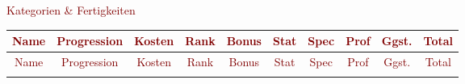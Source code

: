 \begin{center}
\textcolor{Maroon}{\Large Kategorien \& Fertigkeiten}


\begin{longtable}{llrrrrrrrr}

\multicolumn{1}{c}{\textcolor{Maroon}{Name}} & \multicolumn{1}{c}{\textcolor{Maroon}{Progression}} & \multicolumn{1}{c}{\textcolor{Maroon}{Kosten}} & \multicolumn{1}{c}{\textcolor{Maroon}{Rank}} & \multicolumn{1}{c}{\textcolor{Maroon}{Bonus}} & \multicolumn{1}{c}{\textcolor{Maroon}{Stat}} & \multicolumn{1}{c}{\textcolor{Maroon}{Spec}} & \multicolumn{1}{c}{\textcolor{Maroon}{Prof}} & \multicolumn{1}{c}{\textcolor{Maroon}{Ggst.}} & \multicolumn{1}{c}{\textcolor{Maroon}{Total}} \\ \hline 
\endfirsthead

\multicolumn{1}{c}{\textcolor{Maroon}{Name}} & \multicolumn{1}{c}{\textcolor{Maroon}{Progression}} & \multicolumn{1}{c}{\textcolor{Maroon}{Kosten}} & \multicolumn{1}{c}{\textcolor{Maroon}{Rank}} & \multicolumn{1}{c}{\textcolor{Maroon}{Bonus}} &  \multicolumn{1}{c}{\textcolor{Maroon}{Stat}} & \multicolumn{1}{c}{\textcolor{Maroon}{Spec}} &  \multicolumn{1}{c}{\textcolor{Maroon}{Prof}} &\multicolumn{1}{c}{\textcolor{Maroon}{Ggst.}} & \multicolumn{1}{c}{\textcolor{Maroon}{Total}} \\
\hline 
\endhead

\endfoot


\end{longtable}
\end{center}
